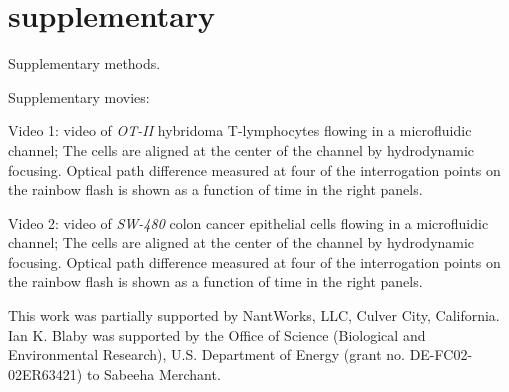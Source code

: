 \documentclass[aps,pra,reprint,longbibliography,superscriptaddress]{revtex4-1}
\begin{document}

\begin{thebibliography}{61}%

\end{thebibliography}%




\section*{supplementary}
Supplementary methods.

Supplementary movies:

Video 1: video of \textit{OT-II} hybridoma T-lymphocytes flowing in a microfluidic channel; The cells are aligned at the center of the channel by hydrodynamic focusing. Optical path difference measured at four of the interrogation points on the rainbow flash is shown as a function of time in the right panels.

Video 2: video of \textit{SW-480} colon cancer epithelial cells flowing in a microfluidic channel; The cells are aligned at the center of the channel by hydrodynamic focusing. Optical path difference measured at four of the interrogation points on the rainbow flash is shown as a function of time in the right panels.

\begin{acknowledgments}
This work was partially supported by NantWorks, LLC, Culver City, California. Ian K. Blaby was supported by the Office of Science (Biological and Environmental Research), U.S. Department of Energy (grant no. DE-FC02-02ER63421) to Sabeeha Merchant.
\end{acknowledgments}
\end{document}
